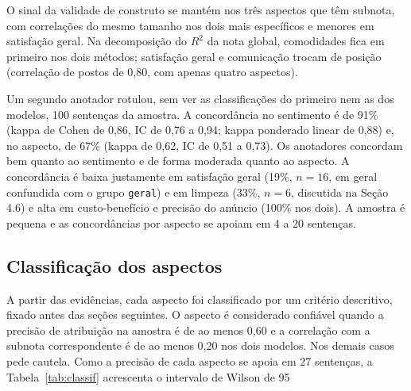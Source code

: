 \begin{table}[htb]
\centering
\caption{Checagem com LDA: correlação do perfil, validade de construto e parcela do $R^2$ da nota global.}
\small
{}
\label{tab:lda}
\end{table}

O sinal da validade de construto se mantém nos três aspectos que têm subnota, com correlações do mesmo tamanho nos dois mais específicos e menores em satisfação geral. Na decomposição do $R^2$ da nota global, comodidades fica em primeiro nos dois métodos; satisfação geral e comunicação trocam de posição (correlação de postos de 0,80, com apenas quatro aspectos).

Um segundo anotador rotulou, sem ver as classificações do primeiro nem as dos modelos, 100 sentenças da amostra. A concordância no sentimento é de 91\% (kappa de Cohen de 0,86, IC de 0,76 a 0,94; kappa ponderado linear de 0,88) e, no aspecto, de 67\% (kappa de 0,62, IC de 0,51 a 0,73). Os anotadores concordam bem quanto ao sentimento e de forma moderada quanto ao aspecto. A concordância é baixa justamente em satisfação geral (19\%, $n = 16$, em geral confundida com o grupo \texttt{geral}) e em limpeza (33\%, $n = 6$, discutida na Seção 4.6) e alta em custo-benefício e precisão do anúncio (100\% nos dois). A amostra é pequena e as concordâncias por aspecto se apoiam em 4 a 20 sentenças.

\subsection{Classificação dos aspectos}

A partir das evidências, cada aspecto foi classificado por um critério descritivo, fixado antes das seções seguintes. O aspecto é considerado confiável quando a precisão de atribuição na amostra é de ao menos 0,60 e a correlação com a subnota correspondente é de ao menos 0,20 nos dois modelos. Nos demais casos pede cautela. Como a precisão de cada aspecto se apoia em 27 sentenças, a Tabela~\ref{tab:classif} acrescenta o intervalo de Wilson de 95%

